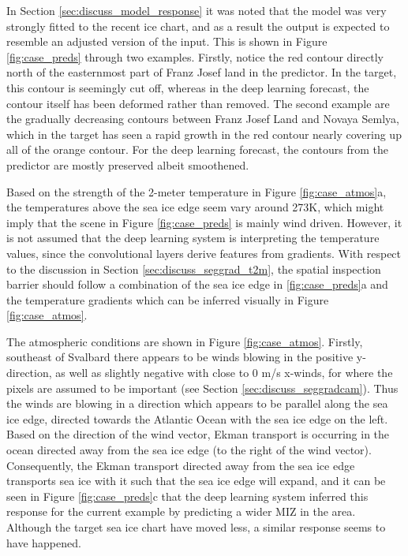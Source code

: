 \documentclass[../main/thesis]{subfiles}
\begin{document}
In Section \ref{sec:discuss_model_response} it was noted that the model was very strongly fitted to the recent ice chart, and as a result the output is expected to resemble an adjusted version of the input. This is shown in Figure \ref{fig:case_preds} through two examples. Firstly, notice the red contour directly north of the easternmost part of Franz Josef land in the predictor. In the target, this contour is seemingly cut off, whereas in the deep learning forecast, the contour itself has been deformed rather than removed. The second example are the gradually decreasing contours between Franz Josef Land and Novaya Semlya, which in the target has seen a rapid growth in the red contour nearly covering up all of the orange contour. For the deep learning forecast, the contours from the predictor are mostly preserved albeit smoothened.

Based on the strength of the 2-meter temperature in Figure \ref{fig:case_atmos}a, the temperatures above the sea ice edge seem vary around 273K, which might imply that the scene in Figure \ref{fig:case_preds} is mainly wind driven. However, it is not assumed that the deep learning system is interpreting the temperature values, since the convolutional layers derive features from gradients. With respect to the discussion in Section \ref{sec:discuss_seggrad_t2m}, the spatial inspection barrier should follow a combination of the sea ice edge in \ref{fig:case_preds}a and the temperature gradients which can be inferred visually in Figure \ref{fig:case_atmos}.

The atmospheric conditions are shown in Figure \ref{fig:case_atmos}. Firstly, southeast of Svalbard there appears to be winds blowing in the positive y-direction, as well as slightly negative with close to 0 m/s x-winds, for where the pixels are assumed to be important (see Section \ref{sec:discuss_seggradcam}). Thus the winds are blowing in a direction which appears to be parallel along the sea ice edge, directed towards the Atlantic Ocean with the sea ice edge on the left. Based on the direction of the wind vector, Ekman transport is occurring in the ocean directed away from the sea ice edge (to the right of the wind vector). Consequently, the Ekman transport directed away from the sea ice edge transports sea ice with it \citep{Fennel1998} such that the sea ice edge will expand, and it can be seen in Figure \ref{fig:case_preds}c that the deep learning system inferred this response for the current example by predicting a wider MIZ in the area. Although the target sea ice chart have moved less, a similar response seems to have happened.
\end{document}
